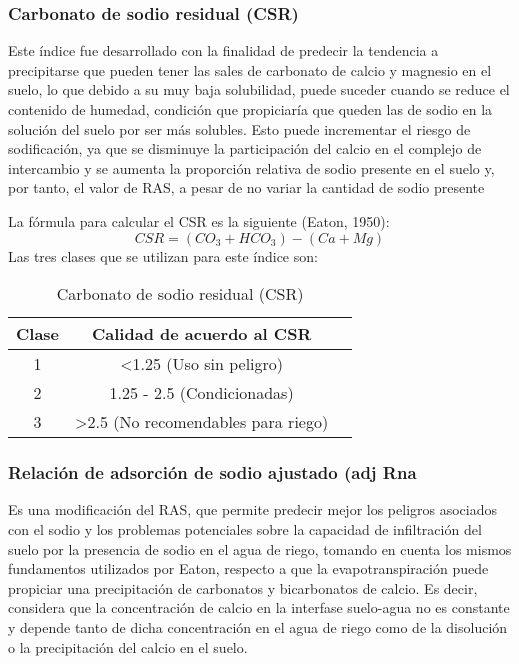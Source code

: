 \subsubsection{Carbonato de sodio residual (CSR)}
Este índice fue desarrollado con la finalidad de predecir la tendencia a precipitarse
que pueden tener las sales de carbonato de calcio y magnesio en el suelo, lo que
debido a su muy baja solubilidad, puede suceder cuando se reduce el contenido de
humedad, condición que propiciaría que queden las de sodio en la solución del suelo
por ser más solubles. Esto puede incrementar el riesgo de sodificación, ya que se
disminuye la participación del calcio en el complejo de intercambio y se aumenta la
proporción relativa de sodio presente en el suelo y, por tanto, el valor de RAS, a
pesar de no variar la cantidad de sodio presente

La fórmula para calcular el CSR es la siguiente (Eaton, 1950):
\begin{equation}
  CSR = (CO_3 + HCO_3) - (Ca + Mg)
\end{equation}
Las tres clases que se utilizan para este índice son:
\begin{table}[h!]
  \centering
  \begin{tabular}{@{}ccc@{}}
  \toprule
  Clase & Calidad de acuerdo al CSR                      &  \\ \midrule
  1     & \textless 1.25 (Uso sin peligro)               &  \\
  2     & 1.25 - 2.5 (Condicionadas)                     &  \\
  3     & \textgreater 2.5 (No recomendables para riego) &  \\ \bottomrule
  \end{tabular}
  \caption{Carbonato de sodio residual (CSR)}
  \label{tabs9}
\end{table}
\subsubsection{Relación de adsorción de sodio ajustado (adj Rna}
Es una modificación del RAS, que permite predecir mejor los peligros asociados con el sodio y los problemas potenciales sobre la capacidad de infiltración del suelo por la presencia de sodio en el agua de riego, tomando en cuenta los mismos fundamentos utilizados por Eaton, respecto a que la evapotranspiración puede propiciar una precipitación de carbonatos y bicarbonatos de calcio. Es decir, considera que la concentración de calcio en la interfase suelo-agua no es constante y depende tanto de dicha concentración en el agua de riego como de la disolución o la precipitación del calcio en el suelo.

